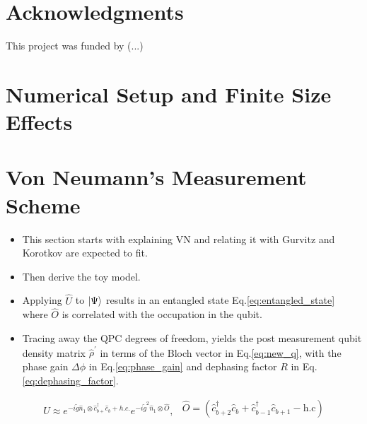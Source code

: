 \documentclass[10pt,
 amsmath,amssymb,
 aps,prb, twocolumn
]{revtex4-2}
\begin{document}
\section{Acknowledgments}

This project was funded by (...)


\appendix 

\section{Numerical Setup and Finite Size Effects}\label{app:numerical_setup}

\section{Von Neumann's Measurement Scheme}\label{app:derivation_backaction}

\begin{itemize}
    \item This section starts with explaining VN and relating it with Gurvitz and Korotkov are expected to fit.     
    \item Then derive the toy model.

    \item Applying $\hat{U}$ to $\ket{\Psi}$ results in an entangled state Eq.\eqref{eq:entangled_state} where $\hat{O}$ is correlated with the occupation in the qubit. 
    
    \item Tracing away the QPC degrees of freedom, yields the post measurement qubit density matrix $\hat{\rho}^\prime$ in terms of the Bloch vector in Eq.\eqref{eq:new_q}, with the phase gain $\Delta \phi$ in Eq.\eqref{eq:phase_gain} and dephasing factor $R$ in Eq.\eqref{eq:dephasing_factor}.
\end{itemize}

\begin{subequations}\label{eq:von_neumann_H}
    \begin{align}
    \hat{U} \approx e^{-i \tilde{g}\hat{n}_1 \otimes \hat{c}^\dagger_{b+}\hat{c}_b + h.c.} e^{-i \tilde{g}^2 \hat{n}_1 \otimes \hat{O}},
\end{align}

\begin{align}
    \hat{O} = (\hat{c}^\dagger_{b+2}\hat{c}_{b} +\hat{c}^\dagger_{b-1}\hat{c}_{b+1} - \text{h.c})
\end{align}
\end{subequations}
\end{document}
